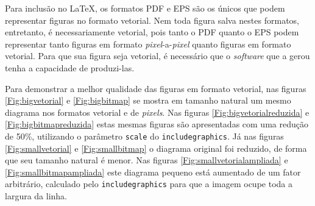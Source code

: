 Para inclusão no \LaTeX, os formatos PDF e EPS são os únicos que podem
representar figuras no formato vetorial. Nem toda figura salva nestes
formatos, entretanto, é necessariamente vetorial, pois tanto o PDF
quanto o EPS podem representar tanto figuras em formato
\emph{pixel}-a-\emph{pixel} quanto figuras em formato vetorial. Para
que sua figura seja vetorial, é necessário que o \emph{software} que a
gerou tenha a capacidade de produzi-las.

Para demonstrar a melhor qualidade das figuras em formato vetorial,
nas figuras \ref{Fig:bigvetorial} e \ref{Fig:bigbitmap} se mostra em
tamanho natural um mesmo diagrama nos formatos vetorial e de
\emph{pixels}. Nas figuras \ref{Fig:bigvetorialreduzida} e
\ref{Fig:bigbitmapreduzida} estas mesmas figuras são apresentadas
com uma redução de 50\%, utilizando o parâmetro \texttt{scale} do
\texttt{includegraphics}. Já nas figuras \ref{Fig:smallvetorial} e
\ref{Fig:smallbitmap} o diagrama original foi reduzido, de forma que
seu tamanho natural é menor. Nas figuras
\ref{Fig:smallvetorialampliada} e \ref{Fig:smallbitmapampliada}
este diagrama pequeno está aumentado de um fator arbitrário, calculado
pelo \texttt{includegraphics} para que a imagem ocupe toda a largura
da linha.


